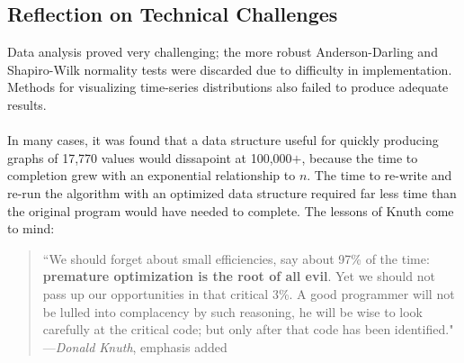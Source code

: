 \documentclass{acmtog}
\begin{document}
\subsection{Reflection on Technical Challenges}
Data analysis proved very challenging; the more robust Anderson-Darling and Shapiro-Wilk normality tests were discarded due to difficulty in implementation. Methods for visualizing time-series distributions also failed to produce adequate results.
\\
\\
In many cases, it was found that a data structure useful for quickly producing graphs of 17,770 values would dissapoint at 100,000$+$, because the time to completion grew with an exponential relationship to $n$. The time to re-write and re-run the algorithm with an optimized data structure required far less time than the original program would have needed to complete. The lessons of Knuth come to mind:

\begin{quote}
``We should forget about small efficiencies, say about 97\% of the time: \textbf{premature optimization is the root of all evil}. Yet we should not pass up our opportunities in that critical 3\%. A good programmer will not be lulled into complacency by such reasoning, he will be wise to look carefully at the critical code; but only after that code has been identified."\\

\hspace{5em}---\textit{Donald Knuth}, emphasis added \cite{knuth-01}
\end{quote}

\medskip






\medskip








\end{document}
